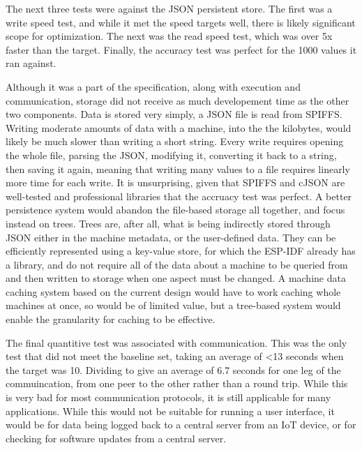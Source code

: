 \documentclass{article}
\begin{document}
The next three tests were against the JSON persistent store. The first was a write speed test, and while it met the speed targets well, there is likely significant scope for optimization. The next was the read speed test, which was over 5x faster than the target. Finally, the accuracy test was perfect for the 1000 values it ran against.

Although it was a part of the specification, along with execution and communication, storage did not receive as much developement time as the other two components. Data is stored very simply, a JSON file is read from SPIFFS. Writing moderate amounts of data with a machine, into the the kilobytes, would likely be much slower than writing a short string. Every write requires opening the whole file, parsing the JSON, modifying it, converting it back to a string, then saving it again, meaning that writing many values to a file requires linearly more time for each write. It is unsurprising, given that SPIFFS and cJSON are well-tested and professional libraries that the accruacy test was perfect. A better persistence system would abandon the file-based storage all together, and focus instead on trees. Trees are, after all, what is being indirectly stored through JSON either in the machine metadata, or the user-defined data. They can be efficiently represented using a key-value store, for which the ESP-IDF already has a library, and do not require all of the data about a machine to be queried from and then written to storage when one aspect must be changed. A machine data caching system based on the current design would have to work caching whole machines at once, so would be of limited value, but a tree-based system would enable the granularity for caching to be effective.

The final quantitive test was associated with communication. This was the only test that did not meet the baseline set, taking an average of <13 seconds when the target was 10. Dividing to give an average of 6.7 seconds for one leg of the commuincation, from one peer to the other rather than a round trip. While this is very bad for most communication protocols, it is still applicable for many applications. While this would not be suitable for running a user interface, it would be for data being logged back to a central server from an IoT device, or for checking for software updates from a central server. 
\end{document}

